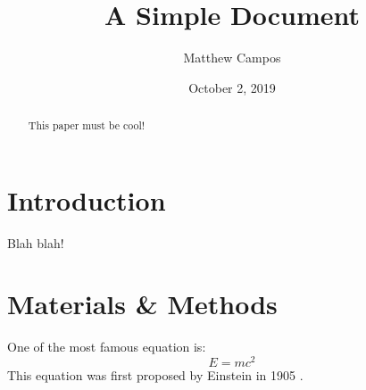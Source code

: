 \documentclass[12pt]{article}
\title{A Simple Document}
\author{Matthew Campos}
\date{October 2, 2019}
\begin{document}
    \maketitle

    \begin{abstract}
        This paper must be cool!
    \end{abstract}

    \section{Introduction}
        Blah blah!

    \section{Materials \& Methods}
    One of the most famous equation is:
    \begin{equation}
        E = mc^2
    \end{equation}
    This equation was first proposed by Einstein in 1905
    \cite{einstein1905does}.

    
    
\end{document}
